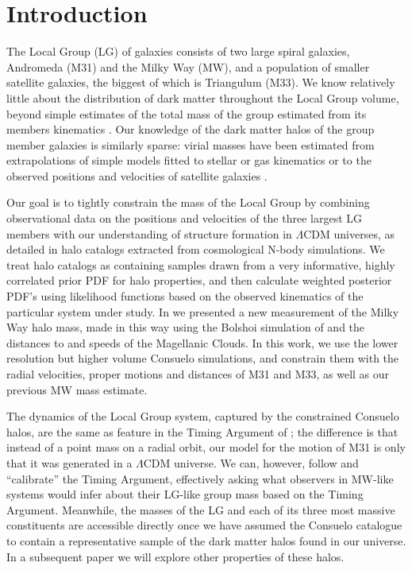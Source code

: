 \documentclass[iop,apj]{emulateapj}
\newcommand{\bolshoi}{{\sc Bolshoi }}
\newcommand{\consuelo}{{\sc Consuelo }}
\begin{document}


\section{Introduction}
\label{sec:intro}

The Local Group (LG) of galaxies consists of two large spiral galaxies,
Andromeda (M31) and the Milky Way (MW), and a population of smaller
satellite galaxies, the biggest of which is Triangulum (M33). We know
relatively little about the distribution of dark matter throughout the Local
Group volume, beyond simple estimates of the total mass of the group
estimated from its members kinematics \citep[e.g.\ ][hereafter VG08]{vdM+G08}.
Our knowledge of the dark matter halos of the group member galaxies is
similarly sparse: virial masses have been estimated from extrapolations of
simple models fitted to stellar or gas kinematics \citep[e.g.\
][]{Xue+08,M31rotcurve} or to the observed positions and 
velocities of satellite galaxies \citep[e.g.\ ][]{EvansEtc}. 

Our goal is to tightly constrain the mass of the Local Group
by combining observational data on the  positions and velocities of the
three largest LG members with our understanding of structure formation
in $\Lambda$CDM universes, as detailed in halo catalogs extracted from
cosmological N-body simulations. We treat halo catalogs as containing
samples drawn from a very informative, highly correlated prior PDF for
halo properties, and then  calculate weighted posterior PDF's using likelihood
functions based on the observed kinematics of the particular system
under study. In \citet[][hereafter B11]{Bus++11} we presented a new
measurement of the Milky Way halo mass, made in this way using the
\bolshoi simulation of \citet{Bolshoi} and the distances to and speeds
of the Magellanic Clouds. In this work, we use the lower resolution but
higher volume \consuelo simulations, and constrain them with the radial
velocities, proper motions and distances of M31 and M33, as well as our
previous MW mass estimate.

The dynamics of the Local Group system, captured by the constrained
\consuelo halos, are the same as feature in the Timing Argument of
\citet{K+W59}; the difference is that instead of a point mass on a
radial orbit, our model for the motion of M31 is only that it was
generated in a $\Lambda$CDM universe. We can, however, follow
\citet{L+W08} and ``calibrate'' the Timing Argument, effectively asking
what observers in MW-like systems would infer about their LG-like group
mass based on the Timing Argument.  Meanwhile, the masses of the LG and
each of its three most massive constituents are accessible directly once
we have assumed the \consuelo catalogue to contain a representative
sample of the dark matter halos found in our universe. In a subsequent
paper we will explore other properties of these halos.
\end{document}

